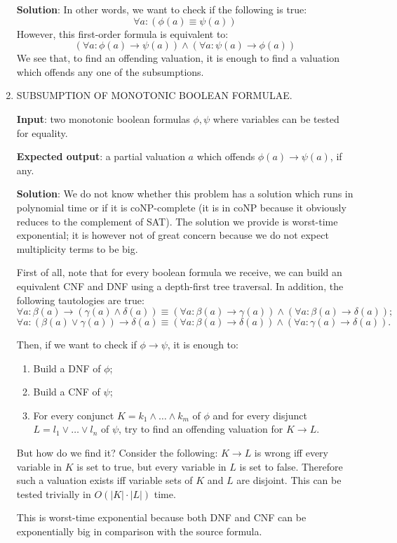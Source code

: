 \documentclass[a4paper,14pt]{extreport}
\begin{document}
\begin{enumerate}
        \textbf{Solution}: In other words, we want to check if the following is
        true:
        \[ \forall a: (\phi(a) \equiv \psi(a)) \]
        However, this first-order formula is equivalent to:
        \[
            (\forall a: \phi(a) \to \psi(a)) \land
            (\forall a: \psi(a) \to \phi(a))
        \]
        We see that, to find an offending valuation, it is enough to find a
        valuation which offends any one of the subsumptions.

    \item SUBSUMPTION OF MONOTONIC BOOLEAN FORMULAE.

        \textbf{Input}: two monotonic boolean formulas $\phi, \psi$ where
        variables can be tested for equality.

        \textbf{Expected output}: a partial valuation $a$ which offends
        $\phi(a) \to \psi (a)$, if any.

        \textbf{Solution}: We do not know whether this problem has a solution
        which runs in polynomial time or if it is coNP-complete (it is in coNP
        because it obviously reduces to the complement of SAT). The solution we
        provide is worst-time exponential; it is however not of great concern
        because we do not expect multiplicity terms to be big.

        First of all, note that for every boolean formula we receive, we can
        build an equivalent CNF and DNF using a depth-first tree traversal. In
        addition, the following tautologies are true:
        \[
            \forall a: \beta(a) \to (\gamma(a) \land \delta(a))
            \equiv (\forall a: \beta(a) \to \gamma(a))
            \land (\forall a: \beta(a) \to \delta(a));
        \]
        \[
            \forall a: (\beta(a) \lor \gamma(a)) \to \delta(a)
            \equiv (\forall a: \beta(a) \to \delta(a))
            \land (\forall a: \gamma(a) \to \delta(a)).
        \]

        Then, if we want to check if $\phi \to \psi$, it is enough to:
        \begin{enumerate}
            \item Build a DNF of $\phi$;
            \item Build a CNF of $\psi$;
            \item For every conjunct $K = k_1 \land \ldots \land k_m$ of $\phi$
                and for every disjunct $L = l_1 \lor \ldots \lor l_n$ of $\psi$,
                try to find an offending valuation for $K \to L$.
        \end{enumerate}

        But how do we find it? Consider the following: $K \to L$ is wrong iff
        every variable in $K$ is set to true, but every variable in $L$ is set
        to false. Therefore such a valuation exists iff variable sets of $K$ and
        $L$ are disjoint. This can be tested trivially in $O(|K| \cdot |L|)$
        time.

        This is worst-time exponential because both DNF and CNF can be
        exponentially big in comparison with the source formula.
\end{enumerate}
\end{document}
